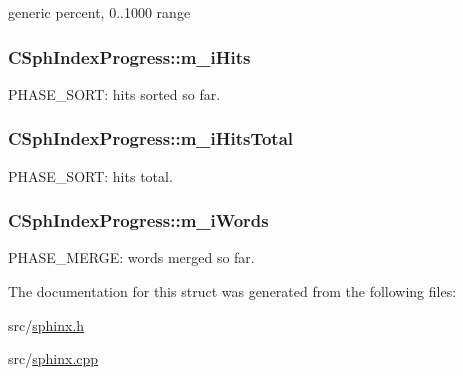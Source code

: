 generic percent, 0..1000 range 

\hypertarget{structCSphIndexProgress_af102bc45918ece2ba64682c3e3f7db25}{
\subsubsection[{m\-\_\-i\-Hits}]{ C\-Sph\-Index\-Progress\-::m\-\_\-i\-Hits}}\label{structCSphIndexProgress_af102bc45918ece2ba64682c3e3f7db25}


P\-H\-A\-S\-E\-\_\-\-S\-O\-R\-T\-: hits sorted so far. 

\hypertarget{structCSphIndexProgress_ad731d8b12fc557bd27ad3036560f8cd4}{
\subsubsection[{m\-\_\-i\-Hits\-Total}]{ C\-Sph\-Index\-Progress\-::m\-\_\-i\-Hits\-Total}}\label{structCSphIndexProgress_ad731d8b12fc557bd27ad3036560f8cd4}


P\-H\-A\-S\-E\-\_\-\-S\-O\-R\-T\-: hits total. 

\hypertarget{structCSphIndexProgress_a3a6cc2a33860b5956c7147ce145434f4}{
\subsubsection[{m\-\_\-i\-Words}]{ C\-Sph\-Index\-Progress\-::m\-\_\-i\-Words}}\label{structCSphIndexProgress_a3a6cc2a33860b5956c7147ce145434f4}


P\-H\-A\-S\-E\-\_\-\-M\-E\-R\-G\-E\-: words merged so far. 



The documentation for this struct was generated from the following files\-:\begin{DoxyCompactItemize}
\item 
src/\hyperlink{sphinx_8h}{sphinx.\-h}\item 
src/\hyperlink{sphinx_8cpp}{sphinx.\-cpp}\end{DoxyCompactItemize}
